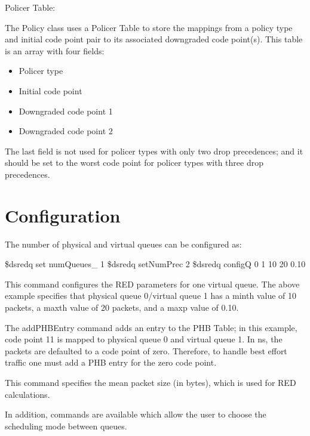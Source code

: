 Policer Table:

The Policy class uses a Policer Table to store the mappings from a policy type and initial code point pair to its associated downgraded code point(s).  This table is an array with four fields:
\begin{itemize}
\item
Policer type
\item
Initial code point
\item
Downgraded code point 1
\item
Downgraded code point 2
\end{itemize}
The last field is not used for policer types with only two drop precedences; and it should be set to the worst code point for policer types with three drop precedences.

\section{Configuration}
\label{sec:diffservconfig}

The number of physical and virtual queues can be configured as:

\begin{program}

\$dsredq set numQueues_ 1
\$dsredq setNumPrec 2
\$dsredq configQ 0 1 10 20 0.10

\end{program}

This command configures the RED parameters for one virtual queue.  The above example specifies that physical queue 0/virtual queue 1 has a minth value of 10 packets, a maxth value of 20 packets, and a maxp value of 0.10.  



The addPHBEntry command adds an entry to the PHB Table; in this example, code point 11 is mapped to physical queue 0 and virtual queue 1. In ns, the packets are defaulted to a code point of zero. Therefore, to handle best effort traffic one must add a PHB entry for the zero code point.


This command specifies the mean packet size (in bytes), which is used for RED calculations.

In addition, commands are available which allow the user to choose the scheduling mode between queues.



